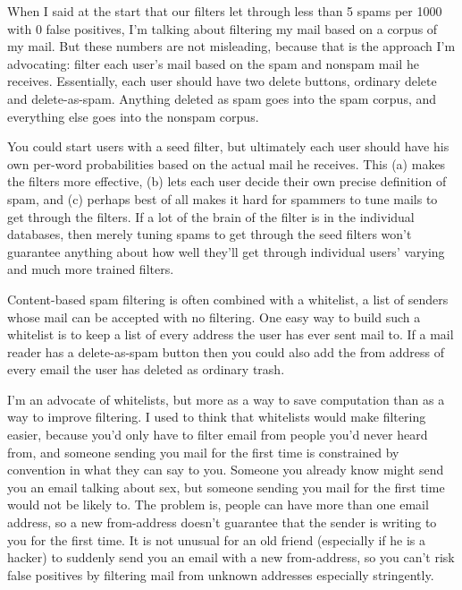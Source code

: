 When
                    I said at the start that our filters let through less than 5
                    spams per 1000 with 0 false positives, I'm talking about
                    filtering my mail based on a corpus of my mail. But these
                    numbers are not misleading, because that is the approach I'm
                    advocating: filter each user's mail based on the spam and
                    nonspam mail he receives. Essentially, each user should have
                    two delete buttons, ordinary delete and delete-as-spam.
                    Anything deleted as spam goes into the spam corpus, and
                    everything else goes into the nonspam corpus.

You
                    could start users with a seed filter, but ultimately each
                    user should have his own per-word probabilities based on the
                    actual mail he receives. This (a) makes the filters more
                    effective, (b) lets each user decide their own precise
                    definition of spam, and (c) perhaps best of all makes it
                    hard for spammers to tune mails to get through the filters.
                    If a lot of the brain of the filter is in the individual
                    databases, then merely tuning spams to get through the seed
                    filters won't guarantee anything about how well they'll get
                    through individual users' varying and much more trained
                    filters.

Content-based spam filtering is often
                    combined with a whitelist, a list of senders whose mail can
                    be accepted with no filtering. One easy way to build such a
                    whitelist is to keep a list of every address the user has
                    ever sent mail to. If a mail reader has a delete-as-spam
                    button then you could also add the from address of every
                    email the user has deleted as ordinary trash.

I'm
                    an advocate of whitelists, but more as a way to save
                    computation than as a way to improve filtering. I used to
                    think that whitelists would make filtering easier, because
                    you'd only have to filter email from people you'd never
                    heard from, and someone sending you mail for the first time
                    is constrained by convention in what they can say to you.
                    Someone you already know might send you an email talking
                    about sex, but someone sending you mail for the first time
                    would not be likely to. The problem is, people can have more
                    than one email address, so a new from-address doesn't
                    guarantee that the sender is writing to you for the first
                    time. It is not unusual for an old friend (especially if he
                    is a hacker) to suddenly send you an email with a new
                    from-address, so you can't risk false positives by filtering
                    mail from unknown addresses especially stringently.

